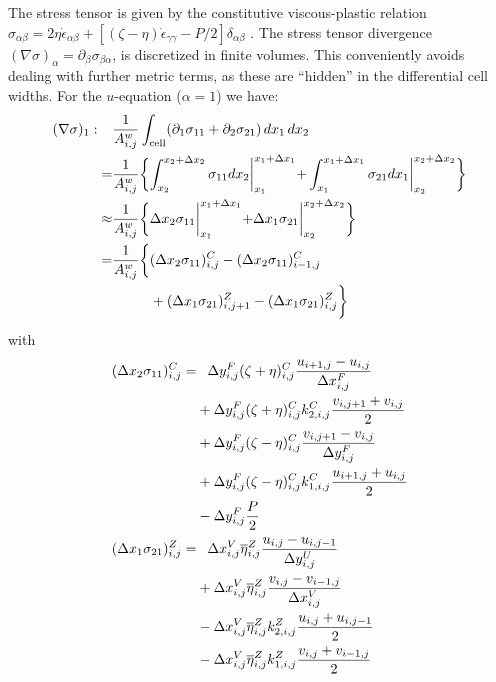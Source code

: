 The stress tensor is given by the constitutive viscous-plastic
relation $\sigma_{\alpha\beta} = 2\eta\dot{\epsilon}_{\alpha\beta} +
[(\zeta-\eta)\dot{\epsilon}_{\gamma\gamma} - P/2
]\delta_{\alpha\beta}$ \citep{hib79}. The stress tensor divergence
$(\nabla\sigma)_{\alpha} = \partial_\beta\sigma_{\beta\alpha}$, is
discretized in finite volumes. This conveniently avoids dealing with
further metric terms, as these are ``hidden'' in the differential cell
widths. For the $u$-equation ($\alpha=1$) we have:
\begin{align}
  (\nabla\sigma)_{1}: \phantom{=}&
  \frac{1}{A_{i,j}^w}
  \int_{\mathrm{cell}}(\partial_1\sigma_{11}+\partial_2\sigma_{21})\,dx_1\,dx_2
  \\\notag
  =& \frac{1}{A_{i,j}^w} \biggl\{
  \int_{x_2}^{x_2+\Delta{x}_2}\sigma_{11}dx_2\biggl|_{x_{1}}^{x_{1}+\Delta{x}_{1}}
  + \int_{x_1}^{x_1+\Delta{x}_1}\sigma_{21}dx_1\biggl|_{x_{2}}^{x_{2}+\Delta{x}_{2}}
  \biggr\} \\ \notag
  \approx& \frac{1}{A_{i,j}^w} \biggl\{
  \Delta{x}_2\sigma_{11}\biggl|_{x_{1}}^{x_{1}+\Delta{x}_{1}}
  + \Delta{x}_1\sigma_{21}\biggl|_{x_{2}}^{x_{2}+\Delta{x}_{2}}
  \biggr\} \\ \notag
  =& \frac{1}{A_{i,j}^w} \biggl\{
  (\Delta{x}_2\sigma_{11})_{i,j}^C -
  (\Delta{x}_2\sigma_{11})_{i-1,j}^C 
  \\\notag
  \phantom{=}& \phantom{\frac{1}{A_{i,j}^w} \biggl\{}
  + (\Delta{x}_1\sigma_{21})_{i,j+1}^Z - (\Delta{x}_1\sigma_{21})_{i,j}^Z
  \biggr\}
\end{align}
with
\begin{align}
  (\Delta{x}_2\sigma_{11})_{i,j}^C =& \phantom{+}
  \Delta{y}_{i,j}^{F}(\zeta + \eta)^{C}_{i,j}
  \frac{u_{i+1,j}-u_{i,j}}{\Delta{x}_{i,j}^{F}} \\ \notag
  &+ \Delta{y}_{i,j}^{F}(\zeta + \eta)^{C}_{i,j}
  k_{2,i,j}^C \frac{v_{i,j+1}+v_{i,j}}{2} \\ \notag
  \phantom{=}& + \Delta{y}_{i,j}^{F}(\zeta - \eta)^{C}_{i,j}
  \frac{v_{i,j+1}-v_{i,j}}{\Delta{y}_{i,j}^{F}} \\ \notag
  \phantom{=}& + \Delta{y}_{i,j}^{F}(\zeta - \eta)^{C}_{i,j}
  k_{1,i,j}^{C}\frac{u_{i+1,j}+u_{i,j}}{2} \\ \notag
  \phantom{=}& - \Delta{y}_{i,j}^{F} \frac{P}{2} \\
  (\Delta{x}_1\sigma_{21})_{i,j}^Z =& \phantom{+}
  \Delta{x}_{i,j}^{V}\overline{\eta}^{Z}_{i,j}
  \frac{u_{i,j}-u_{i,j-1}}{\Delta{y}_{i,j}^{U}} \\ \notag
  & + \Delta{x}_{i,j}^{V}\overline{\eta}^{Z}_{i,j}
  \frac{v_{i,j}-v_{i-1,j}}{\Delta{x}_{i,j}^{V}} \\ \notag
  & - \Delta{x}_{i,j}^{V}\overline{\eta}^{Z}_{i,j} 
  k_{2,i,j}^{Z}\frac{u_{i,j}+u_{i,j-1}}{2} \\ \notag
  & - \Delta{x}_{i,j}^{V}\overline{\eta}^{Z}_{i,j} 
  k_{1,i,j}^{Z}\frac{v_{i,j}+v_{i-1,j}}{2}
\end{align}

